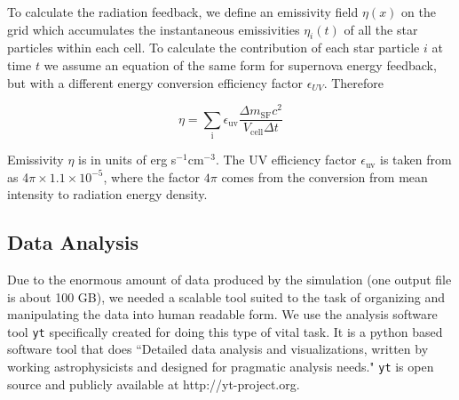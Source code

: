 To calculate the radiation feedback, we define an emissivity field $\eta(x)$ on the grid which accumulates
the instantaneous emissivities $\eta_i(t)$ of all the star particles within each cell. To calculate the contribution of each star particle $i$ at time $t$ we assume an equation of the same form for supernova energy feedback, but with a different energy conversion efficiency factor $\epsilon_{UV}$. Therefore

\begin{equation}
\label{eq:emissivity}
  \eta= \sum_\mathrm{i}\epsilon_\mathrm{uv}\frac{\Delta m_\mathrm{SF} c^2}{V_\mathrm{cell}\Delta t}
\end{equation}

Emissivity $\eta$ is in units of erg s$^{-1}$cm$^{-3}$.   The UV efficiency factor $\epsilon_\mathrm{uv}$ is taken from \cite{RicottiEtAl2002} as 4$\pi\times 1.1 \times 10^{-5}$, where the factor $4\pi$ comes from the conversion from mean intensity to radiation energy density.

\subsection{Data Analysis}
\label{DataAnalysis}

Due to the enormous amount of data produced by the simulation (one output file is about 100 GB), 
we needed a scalable tool suited to the task of organizing and manipulating
the data into human readable form.  We use the analysis software tool \texttt{yt} \citep{TurkEtAl2011} specifically created for doing this type of vital task.  It is a python based software tool that does ``Detailed data analysis and visualizations, 
written by working astrophysicists and designed for pragmatic analysis needs."
\texttt{yt} is open source and publicly available at http://yt-project.org.

